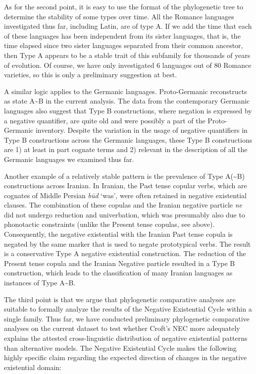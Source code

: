 \documentclass[output=paper]{langsci/langscibook}
\begin{document}
As for the second point, it is easy to use the format of the phylogenetic tree to determine the stability of some types over time. All the Romance languages investigated thus far, including Latin, are of type A.  If we add the time that each of these languages has been independent from its sister languages, that is, the time elapsed since two sister languages separated from their common ancestor, then Type A appears to be a stable trait of this subfamily for thousands of years of evolution. Of course, we have only investigated 6 languages out of 80 Romance varieties, so this is only a preliminary suggestion at best. 

A similar logic applies to the Germanic languages. Proto-Germanic reconstructs as state A{\textasciitilde}B in the current analysis. The data from the contemporary Germanic languages also suggest that Type B constructions, where negation is expressed by a negative quantifier, are quite old and were possibly a part of the Proto-Germanic inventory. Despite the variation in the usage of negative quantifiers in Type B constructions across the Germanic languages, these Type B constructions are 1) at least in part cognate terms and 2) relevant in the description of all the Germanic languages we examined thus far. 

Another example of a relatively stable pattern is the prevalence of Type
A({\textasciitilde}B) constructions across Iranian. In Iranian, the Past
tense copular verbs, which are cognates of Middle Persian \textit{būd}
`was', were often retained in negative existential clauses. The combination
of these copulas and the Iranian negative particle \textit{ne} did not
undergo reduction and univerbation, which was presumably also due to
phonotactic constraints (unlike the Present tense copulas, see
 above). Consequently, the negative existential with the Iranian Past tense copula is negated by the same marker that is used to negate prototypical verbs. The result is a conservative Type A negative existential construction. The reduction of the Present tense copula and the Iranian Negative particle resulted in a Type B construction, which leads to the classification of many Iranian languages as instances of Type A{\textasciitilde}B. 

  The third point is that we argue that phylogenetic comparative analyses are suitable to formally analyze the results of the Negative Existential Cycle within a single family. Thus far, we have conducted preliminary phylogenetic comparative analyses on the current dataset to test whether Croft's NEC more adequately explains the attested cross-linguistic distribution of negative existential patterns than alternative models. The Negative Existential Cycle makes the following highly specific claim regarding the expected direction of changes in the negative existential domain: 
\end{document}
